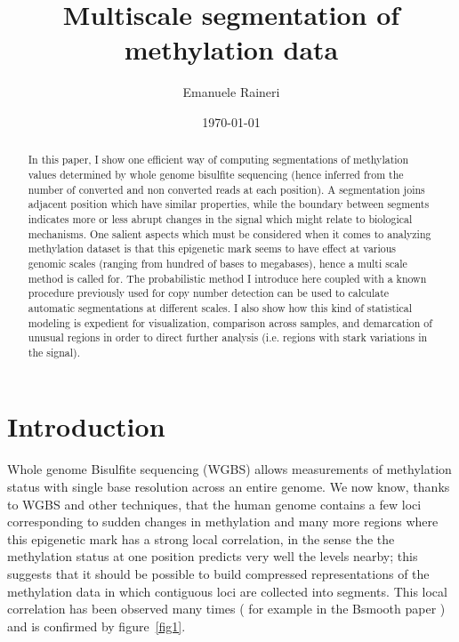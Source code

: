 \documentclass[12pt]{amsart}
\begin{document}
\title{Multiscale segmentation of methylation data}
\author{Emanuele Raineri}
\date{\today}
\maketitle

\begin{abstract}
In this paper, I show one efficient way of computing 
segmentations of methylation values determined by 
whole genome bisulfite sequencing
(hence inferred from the number of converted and non converted reads 
at each position).  
A segmentation joins adjacent position
which have similar properties, while the boundary between segments 
indicates more or less abrupt changes
in the signal which might relate to biological mechanisms. 
One salient aspects which must be considered when it comes to 
analyzing methylation dataset is that this epigenetic mark seems 
to have effect at various genomic scales 
(ranging from hundred of bases to megabases), hence a multi scale method 
is called for. 
The probabilistic method I introduce here 
coupled with a known procedure previously
used for copy number detection
can be used to calculate automatic segmentations at different scales.
I also show how this 
kind of statistical modeling is expedient for 
visualization, comparison across samples,
and demarcation of unusual regions in 
order to direct further analysis (i.e. regions with stark variations in the signal).
\end{abstract}

\section{Introduction}

Whole genome Bisulfite sequencing (WGBS) allows measurements of methylation 
status with single base resolution across an entire genome. We now know,
thanks to WGBS and other techniques,  
that the human genome contains a few loci corresponding to sudden changes in methylation 
and many more regions where this epigenetic mark has a strong local
correlation, in the sense the the methylation status at one position predicts 
very well the levels nearby; this suggests that it should be possible
to build compressed representations of the methylation data in which contiguous loci 
are collected into segments.
This local correlation has been observed many times ( for example
in the Bsmooth paper \cite{bsmooth}) and is confirmed by 
figure~\ref{fig1}. 
\end{document}
